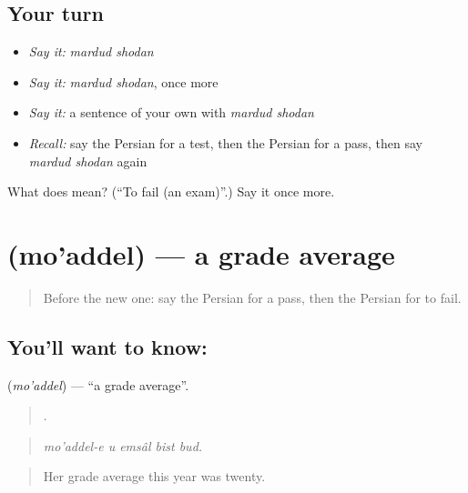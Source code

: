 \subsection*{Your turn}
\begin{itemize}
\raggedright
  \item \emph{Say it:} \emph{mardud shodan}
  \item \emph{Say it:} \emph{mardud shodan}, once more
  \item \emph{Say it:} a sentence of your own with \emph{mardud shodan}
  \item \emph{Recall:} say the Persian for a test, then the Persian for a pass, then say \emph{mardud shodan} again
\end{itemize}

\begin{tcolorbox}[breakable,colback=teal!4,colframe=teal!35!black,title={Before you move on}]
What does   mean? (\textquotedblleft{}To fail (an exam)\textquotedblright{}.) Say it once more.
\end{tcolorbox}
\section[\texorpdfstring{\fa{معدل} (mo'addel)}{معدل (mo'addel)}]{ (mo'addel) — a grade average}

\label{lesson:FA-C399-moaddel}



\begin{quote}
Before the new one: say the Persian for a pass, then the Persian for to fail.
\end{quote}

\subsection*{You'll want to know: }
\textbf{} (\emph{mo'addel}) — \textquotedblleft{}a grade average\textquotedblright{}.

\begin{quote}
    .
\end{quote}

\begin{quote}
\emph{mo'addel-e u emsâl bist bud.}
\end{quote}

\begin{quote}
Her grade average this year was twenty.
\end{quote}

